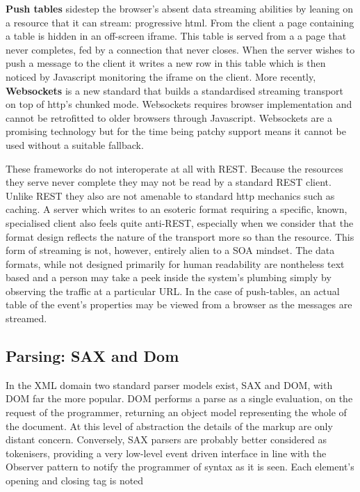 \documentclass[]{article}
\begin{document}
\textbf{Push tables} sidestep the browser's absent data streaming
abilities by leaning on a resource that it can stream: progressive html.
From the client a page containing a table is hidden in an off-screen
iframe. This table is served from a a page that never completes, fed by
a connection that never closes. When the server wishes to push a message
to the client it writes a new row in this table which is then noticed by
Javascript monitoring the iframe on the client. More recently,
\textbf{Websockets} is a new standard that builds a standardised
streaming transport on top of http's chunked mode. Websockets requires
browser implementation and cannot be retrofitted to older browsers
through Javascript. Websockets are a promising technology but for the
time being patchy support means it cannot be used without a suitable
fallback.

These frameworks do not interoperate at all with REST. Because the
resources they serve never complete they may not be read by a standard
REST client. Unlike REST they also are not amenable to standard http
mechanics such as caching. A server which writes to an esoteric format
requiring a specific, known, specialised client also feels quite
anti-REST, especially when we consider that the format design reflects
the nature of the transport more so than the resource. This form of
streaming is not, however, entirely alien to a SOA mindset. The data
formats, while not designed primarily for human readability are
nontheless text based and a person may take a peek inside the system's
plumbing simply by observing the traffic at a particular URL. In the
case of push-tables, an actual table of the event's properties may be
viewed from a browser as the messages are streamed.

\subsection{Parsing: SAX and Dom}

In the XML domain two standard parser models exist, SAX and DOM, with
DOM far the more popular. DOM performs a parse as a single evaluation,
on the request of the programmer, returning an object model representing
the whole of the document. At this level of abstraction the details of
the markup are only distant concern. Conversely, SAX parsers are
probably better considered as tokenisers, providing a very low-level
event driven interface in line with the Observer pattern to notify the
programmer of syntax as it is seen. Each element's opening and closing
tag is noted
\end{document}
